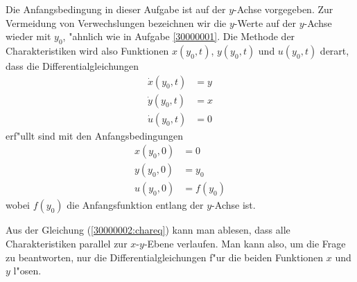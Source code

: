 \begin{loesung}
Die Anfangsbedingung in dieser Aufgabe ist auf der $y$-Achse vorgegeben.
Zur Vermeidung von Verwechslungen bezeichnen wir die $y$-Werte auf
der $y$-Achse wieder mit $y_0$, "ahnlich wie in Aufgabe \ref{30000001}.
Die Methode der Charakteristiken wird also Funktionen $x(y_0,t)$,
$y(y_0,t)$ und $u(y_0,t)$ derart, dass die Differentialgleichungen
\begin{equation}
\begin{aligned}
\dot x(y_0, t)&=y\\
\dot y(y_0, t)&=x\\
\dot u(y_0, t)&=0
\end{aligned}
\label{30000002:chareq}
\end{equation}
erf"ullt sind mit den Anfangsbedingungen 
\begin{align*}
x(y_0, 0)&=0\\
y(y_0, 0)&=y_0\\
u(y_0, 0)&=f(y_0)
\end{align*}
wobei $f(y_0)$ die Anfangsfunktion entlang der $y$-Achse ist.
\begin{teilaufgaben}
\item
Aus der Gleichung (\ref{30000002:chareq}) kann man ablesen,
dass alle Charakteristiken parallel zur $x$-$y$-Ebene verlaufen.
Man kann also, um die Frage zu beantworten, nur die Differentialgleichungen
f"ur die beiden Funktionen $x$ und $y$ l"osen.


\end{teilaufgaben}
\end{loesung}
